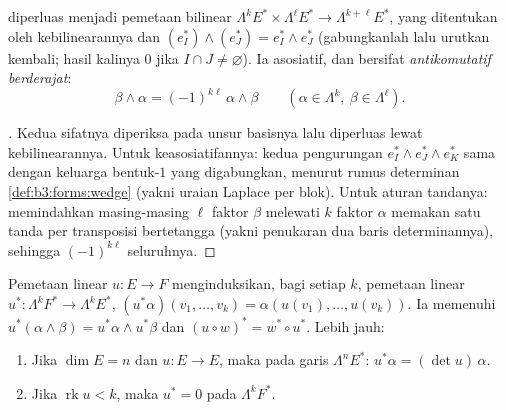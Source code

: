\begin{definition}\label{def:b3:forms:wedgegeneral}
 diperluas menjadi pemetaan bilinear
$\Lambda^kE^* \times \Lambda^\ell E^* \to
\Lambda^{k+\ell}E^*$, yang ditentukan oleh kebilinearannya dan
$(e_I^*) \wedge (e_J^*) = e_I^* \wedge e_J^*$ (gabungkanlah
lalu urutkan kembali; hasil kalinya $0$ jika $I \cap J \neq
\varnothing$). Ia asosiatif, dan bersifat
\emph{antikomutatif berderajat}:
\[
\beta \wedge \alpha = (-1)^{k\ell}\,\alpha \wedge \beta
\qquad (\alpha \in \Lambda^k, \ \beta \in \Lambda^\ell).
\]
\end{definition}

\begin{proof}[\omnameProof]
Kedua sifatnya diperiksa pada unsur basisnya lalu diperluas lewat
kebilinearannya. Untuk keasosiatifannya: kedua pengurungan
$e_I^* \wedge e_J^* \wedge e_K^*$ sama dengan  keluarga
bentuk-$1$ yang digabungkan, menurut rumus determinan
\cref{def:b3:forms:wedge} (yakni uraian Laplace per blok).
Untuk aturan tandanya: memindahkan masing-masing $\ell$ faktor $\beta$
melewati $k$ faktor $\alpha$ memakan satu tanda per
transposisi bertetangga (yakni penukaran dua baris determinannya), sehingga
$(-1)^{k\ell}$ seluruhnya.
\end{proof}

\begin{proposition}
\label{prop:b3:forms:linearpullback}
Pemetaan linear $u\colon E \to F$ menginduksikan, bagi setiap $k$,
pemetaan linear $u^*\colon \Lambda^kF^* \to \Lambda^kE^*$,
$(u^*\alpha)(v_1, \dots, v_k) = \alpha(u(v_1), \dots,
u(v_k))$. Ia memenuhi $u^*(\alpha \wedge \beta) = u^*\alpha
\wedge u^*\beta$ dan $(u \circ w)^* = w^* \circ u^*$.
Lebih jauh:
\begin{enumerate}
  \item Jika $\dim E = n$ dan $u\colon E \to E$, maka pada
        garis $\Lambda^nE^*$: $u^*\alpha = (\det u)\,\alpha$.
  \item Jika $\operatorname{rk}u < k$, maka $u^* = 0$ pada
        $\Lambda^kF^*$.
\end{enumerate}
\end{proposition}


